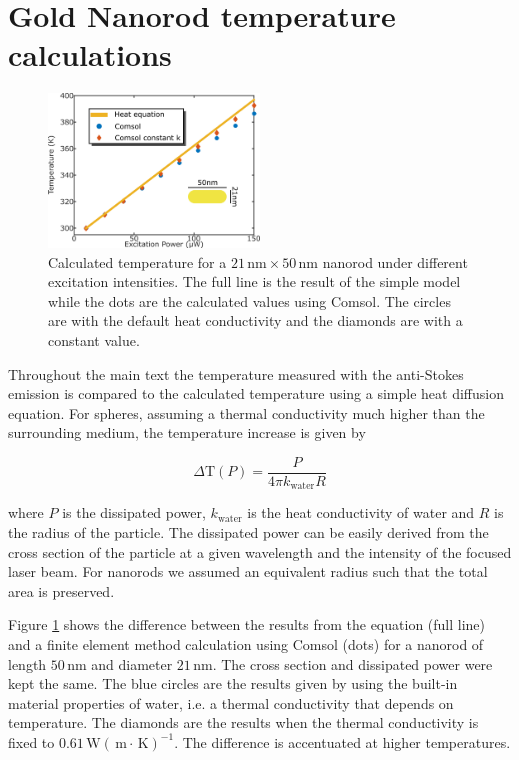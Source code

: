 \documentclass[journal=nalefd,manuscript=letter]{achemso}
\newcommand{\K}{\ensuremath{\,\textrm{K}}}
\newcommand{\nm}{\ensuremath{\,\textrm{nm}}}
\newcommand{\m}{\ensuremath{\,\textrm{m}}}
\newcommand{\W}{\ensuremath{\,\textrm{W}}}
\begin{document}
\section{Gold Nanorod temperature calculations} \label{sec:temp-calc}

\begin{figure}[htp] \centering
\includegraphics[width=0.5\textwidth]{Figures/Supplementary/03_Compare_Comsol/03_Compare_Comsol.png}
\caption{Calculated temperature for a $21\nm\times 50\nm$ nanorod under
different excitation intensities. The full line is the result of the simple
model while the dots are the calculated values using Comsol. The circles are
with the default heat conductivity and the diamonds are with a constant value.}
	\label{fig:Compare-Comsol}
\end{figure}

Throughout the main text the temperature measured with the anti-Stokes emission
is compared to the calculated temperature using a simple heat diffusion
equation. For spheres, assuming a thermal conductivity much higher than the
surrounding medium, the temperature increase is given by

\begin{equation}
	\Delta \textrm{T}(P) = \frac{P}{4\pi k_{\textrm{water}} R}
\end{equation}

\noindent where $P$ is the dissipated power, $k_{\textrm{water}}$ is the heat
conductivity of water and $R$ is the radius of the particle. The dissipated power can be
easily derived from the cross section of the particle at a given wavelength and
the intensity of the focused laser beam. For nanorods we assumed an
equivalent radius such that the total area is preserved.

Figure \ref{fig:Compare-Comsol} shows the difference between the results from
the equation (full line) and a finite element method calculation using Comsol
(dots) for a nanorod of length $50\nm$ and diameter $21\nm$. The cross section
and dissipated power were kept the same. The blue circles are the results given
by using the built-in material properties of water, i.e. a thermal conductivity
that depends on temperature. The diamonds are the results when the thermal
conductivity is fixed to $0.61 \W(\m\cdot\K)^{-1}$. The difference is
accentuated at higher temperatures.
\end{document}
